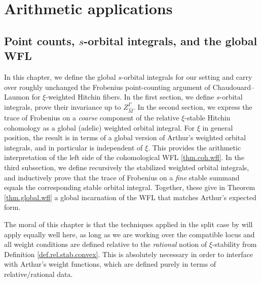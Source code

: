 \documentclass[openany]{amsbook}
\theoremstyle{definition}
\theoremstyle{remark}
\numberwithin{equation}{section}
\renewcommand{\-}{\operatorname{-}}
\begin{document}
\part{Arithmetic applications}

\chapter{Point counts, $s$-orbital integrals, and the global WFL}\label{sect.global.point.counts}

In this chapter, we define the global $s$-orbital integrals for our setting and carry over roughly unchanged the Frobenius point-counting argument of Chaudouard--Laumon \cite[\S 11, 12]{CLII} for $\xi$-weighted Hitchin fibers. In the first section, we define $s$-orbital integrals, prove their invariance up to $Z_{\widehat{M}}^\Gamma$. In the second section, we express the trace of Frobenius on a \emph{coarse} component of the relative $\xi$-stable Hitchin cohomology as a global (adelic) weighted orbital integral. For $\xi$ in general position, the result is in terms of a global version of Arthur's weighted orbital integrals, and in particular is independent of $\xi$. This provides the arithmetic interpretation of the left side of the cohomological WFL \ref{thm.coh.wfl}. In the third subsection, we define recursively the stabilized weighted orbital integrals, and inductively prove that the trace of Frobenius on a \emph{fine} stable summand equals the corresponding stable orbital integral. Together, these give in Theorem \ref{thm.global.wfl} a global incarnation of the WFL that matches Arthur's expected form. 

The moral of this chapter is that the techniques applied in the split case by \cite{CLI} will apply equally well here, as long as we are working over the compatible locus and all weight conditions are defined relative to the \textit{rational} notion of $\xi$-stability from Definition \ref{def.rel.stab.convex}. This is absolutely necessary in order to interface with Arthur's weight functions, which are defined purely in terms of relative/rational data.
\end{document}
